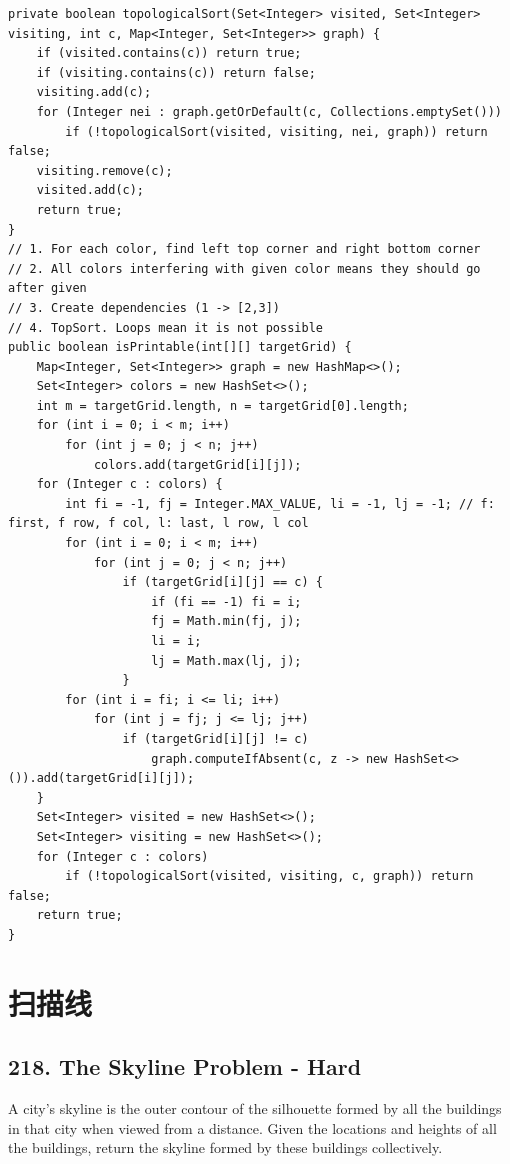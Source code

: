 \documentclass[9pt, b5paaper]{book}
\begin{document}
\begin{verbatim}
private boolean topologicalSort(Set<Integer> visited, Set<Integer> visiting, int c, Map<Integer, Set<Integer>> graph) {
    if (visited.contains(c)) return true;
    if (visiting.contains(c)) return false;
    visiting.add(c);
    for (Integer nei : graph.getOrDefault(c, Collections.emptySet())) 
        if (!topologicalSort(visited, visiting, nei, graph)) return  false;
    visiting.remove(c);
    visited.add(c);
    return true;
}
// 1. For each color, find left top corner and right bottom corner
// 2. All colors interfering with given color means they should go after given
// 3. Create dependencies (1 -> [2,3])
// 4. TopSort. Loops mean it is not possible
public boolean isPrintable(int[][] targetGrid) {
    Map<Integer, Set<Integer>> graph = new HashMap<>();
    Set<Integer> colors = new HashSet<>();
    int m = targetGrid.length, n = targetGrid[0].length;
    for (int i = 0; i < m; i++) 
        for (int j = 0; j < n; j++) 
            colors.add(targetGrid[i][j]);
    for (Integer c : colors) {
        int fi = -1, fj = Integer.MAX_VALUE, li = -1, lj = -1; // f: first, f row, f col, l: last, l row, l col
        for (int i = 0; i < m; i++) 
            for (int j = 0; j < n; j++) 
                if (targetGrid[i][j] == c) {
                    if (fi == -1) fi = i;
                    fj = Math.min(fj, j);
                    li = i;
                    lj = Math.max(lj, j);
                }
        for (int i = fi; i <= li; i++) 
            for (int j = fj; j <= lj; j++) 
                if (targetGrid[i][j] != c) 
                    graph.computeIfAbsent(c, z -> new HashSet<>()).add(targetGrid[i][j]);
    }
    Set<Integer> visited = new HashSet<>();
    Set<Integer> visiting = new HashSet<>();
    for (Integer c : colors) 
        if (!topologicalSort(visited, visiting, c, graph)) return false;
    return true;
}
\end{verbatim}

\chapter{扫描线}
\label{sec-19}
\section{218. The Skyline Problem - Hard}
\label{sec-19-1}
A city's skyline is the outer contour of the silhouette formed by all the buildings in that city when viewed from a distance. Given the locations and heights of all the buildings, return the skyline formed by these buildings collectively.
\end{document}
